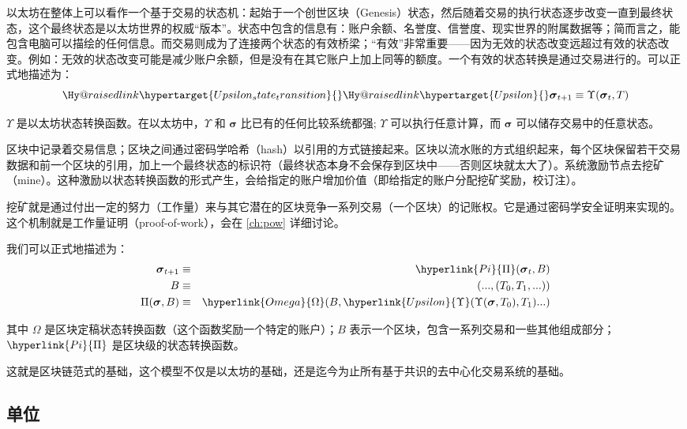 \documentclass[9pt,oneside]{amsart}
\makeatletter
\newcommand{\linkdest}[1]{\Hy@raisedlink{\hypertarget{#1}{}}}
\makeatother
\begin{document}
\begin{multicols}{2}
以太坊在整体上可以看作一个基于交易的状态机：起始于一个创世区块（Genesis）状态，然后随着交易的执行状态逐步改变一直到最终状态，这个最终状态是以太坊世界的权威“版本”。状态中包含的信息有：账户余额、名誉度、信誉度、现实世界的附属数据等；简而言之，能包含电脑可以描绘的任何信息。而交易则成为了连接两个状态的有效桥梁；“有效”非常重要——因为无效的状态改变远超过有效的状态改变。例如：无效的状态改变可能是减少账户余额，但是没有在其它账户上加上同等的额度。一个有效的状态转换是通过交易进行的。可以正式地描述为：
\begin{equation}
\linkdest{Upsilon_state_transition}\linkdest{Upsilon}\boldsymbol{\sigma}_{t+1} \equiv \Upsilon(\boldsymbol{\sigma}_{t}, T)
\end{equation}

$\Upsilon$ 是以太坊状态转换函数。在以太坊中，$\Upsilon$ 和 $\boldsymbol{\sigma}$ 比已有的任何比较系统都强; $\Upsilon$ 可以执行任意计算，而 $\boldsymbol{\sigma}$ 可以储存交易中的任意状态。

区块中记录着交易信息；区块之间通过密码学哈希（hash）以引用的方式链接起来。区块以流水账的方式组织起来，每个区块保留若干交易数据和前一个区块的引用，加上一个最终状态的标识符（最终状态本身不会保存到区块中——否则区块就太大了）。系统激励节点去挖矿（mine）。这种激励以状态转换函数的形式产生，会给指定的账户增加价值（即给指定的账户分配挖矿奖励，校订注）。

挖矿就是通过付出一定的努力（工作量）来与其它潜在的区块竞争一系列交易（一个区块）的记账权。它是通过密码学安全证明来实现的。这个机制就是工作量证明（proof-of-work），会在 \ref{ch:pow} 详细讨论。

我们可以正式地描述为：
\begin{eqnarray}
\boldsymbol{\sigma}_{t+1} & \equiv & \hyperlink{Pi}{\Pi}(\boldsymbol{\sigma}_{t}, B) \\
B & \equiv & (..., (T_0, T_1, ...) ) \\
\Pi(\boldsymbol{\sigma}, B) & \equiv & \hyperlink{Omega}{\Omega}(B, \hyperlink{Upsilon}{\Upsilon}(\Upsilon(\boldsymbol{\sigma}, T_0), T_1) ...)
\end{eqnarray}

其中 \hyperlink{Omega}{$\Omega$} 是区块定稿状态转换函数（这个函数奖励一个特定的账户）；\hyperlink{block}{$B$} 表示一个区块，包含一系列交易和一些其他组成部分；$\hyperlink{Pi}{\Pi}$ 是区块级的状态转换函数。

这就是区块链范式的基础，这个模型不仅是以太坊的基础，还是迄今为止所有基于共识的去中心化交易系统的基础。

\subsection{单位}


\end{multicols}
\end{document}
